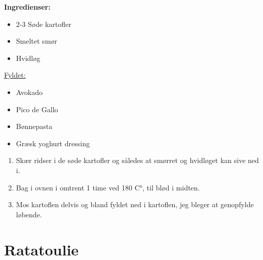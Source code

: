 \documentclass{book}
\begin{document}
\begin{minipage}[t]{0.5\textwidth}
\textbf{Ingredienser:}
\begin{itemize}
    \item 2-3 Søde kartofler
    \item Smeltet smør
    \item Hvidløg
\end{itemize}
\underline{Fyldet:}
\begin{itemize}
    \item Avokado 
    \item Pico de Gallo
    \item Bønnepasta
    \item Græsk yoghurt dressing 
\end{itemize}
\end{minipage}
\begin{minipage}[t]{0.5\textwidth}
\begin{enumerate}
    \item Skær ridser i de søde kartofler og således at smørret og hvidløget kan sive ned i.
    \item Bag i ovnen i omtrent 1 time ved 180 C°, til blød i midten.
    \item Mos kartoflen delvis og bland fyldet ned i kartoflen, jeg bleger at genopfylde løbende.  
\end{enumerate}
\end{minipage}
\newpage
{}
\newpage \section{Ratatoulie}
\end{document}
